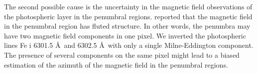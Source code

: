 \documentclass[manuscript]{aastex61}
\begin{document}
 The second possible cause is the uncertainty in the magnetic field observations of the
photospheric layer in the penumbral regions. 
\cite{2002ApJ...575.1131L} reported that the magnetic field in the penumbral
region has fluted structure.
In other words, the penumbra may have two magnetic field components in one pixel.
We inverted the photospheric lines Fe {\sc i} 6301.5 \AA \ and 6302.5 \AA \ with
only a single Milne-Eddington component. 
The presence of several components on the same pixel might lead to a biased estimation of the azimuth of the magnetic field in the penumbral regions.


\end{document}
